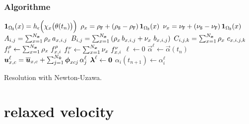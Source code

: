 \documentclass[10pt,a4paper]{article}
\begin{document}
\section{Algorithme}
\begin{algorithm}[H]
$\boldsymbol 1_{\Omega_{\mathtt{S}}}(x)= h_{\epsilon}\Big(\chi_x\big(\theta(t_{n})\big)\Big)$\;
$\rho_x = \rho_{\mathtt{F}} + (\rho_{\mathtt{S}}-\rho_{\mathtt{F}})\,\boldsymbol 1_{\Omega_{\mathtt{S}}}(x)$ \;
$\nu_x = \nu_{\mathtt{F}} + (\nu_{\mathtt{S}}-\nu_{\mathtt{F}})\,\boldsymbol 1_{\Omega_{\mathtt{S}}}(x)$ \;
$A_{i,j} = \sum_{x=1}^{N_{\boldsymbol{x}}}\rho_x\,a_{x, i,j}$ \;
$B_{i,j} = \sum_{x=1}^{N_{\boldsymbol{x}}}\left(\rho_x\,b_{x,i,j}+\nu_x\,\,b_{x, i,j}\right)$ \;
$C_{i,j,k} = \sum_{x=1}^{N_{\boldsymbol{x}}}\rho_x\,\,c_{x, i,j,k}$ \;
$f^\rho_{i} \leftarrow \sum_{x=1}^{N_{\boldsymbol{x}}}\rho_x\,\,f^\rho_{x, i}$\;
$f^\nu_{i} \leftarrow \sum_{x=1}^{N_{\boldsymbol{x}}}\nu_x\,\,f^\nu_{x, i}$\;
\;
$\ell\leftarrow 0$\;
$\vec\alpha ^{\ell} \leftarrow \vec \alpha (t_{n})$\;
$\boldsymbol{u}^{\ell}_{x, c} = \overline{\boldsymbol{u}}_{x, c}+\sum_{j=1}^{N_\Phi}\boldsymbol{\phi}_{xcj}\,\alpha_j^{\ell} $\;
$\boldsymbol{\lambda}^{\ell} \leftarrow \boldsymbol{0}$\; 
$\alpha_i(t_{n+1}) \leftarrow \alpha_i^{\ell}$\;
 \caption{Resolution with Newton-Uzawa.}
\end{algorithm}

\part{relaxed velocity}
\end{document}
